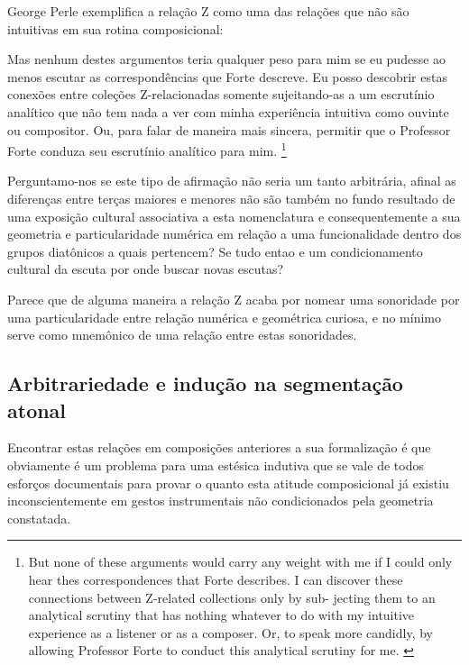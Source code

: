 \documentclass[
	12pt,				%
	openright,			%
	twoside,			%
	a4paper,			%
	english,			%
	french,				%
	spanish,			%
	brazil				%
	]{abntex2}
\begin{document}
George Perle exemplifica a relação Z como uma das relações que não são intuitivas em sua rotina composicional:





\begin{citacao}
Mas nenhum destes argumentos teria qualquer peso para mim se eu pudesse ao menos escutar as correspondências que Forte descreve. Eu posso descobrir estas conexões entre coleções Z-relacionadas somente sujeitando-as a um escrutínio analítico que não tem nada a ver com minha experiência intuitiva como ouvinte ou compositor. Ou, para falar de maneira mais sincera, permitir que o Professor Forte conduza seu escrutínio analítico para mim.
\cite[p.168]{perle1990pitch}\footnote{
But none of these arguments would carry any weight with me if
I could only hear thes correspondences that Forte describes. I can
discover these connections between Z-related collections only by sub-
jecting them to an analytical scrutiny that has nothing whatever to do
with my intuitive experience as a listener or as a composer. Or, to
speak more candidly, by allowing Professor Forte to conduct this
analytical scrutiny for me. 
\cite[p.168]{perle1990pitch}}
\end{citacao}

Perguntamo-nos se este tipo de afirmação não seria um tanto arbitrária, afinal as diferenças entre terças maiores e menores não são também no fundo resultado de uma exposição cultural associativa a esta nomenclatura e consequentemente a sua geometria e particularidade numérica em relação a uma funcionalidade dentro dos grupos diatônicos a quais pertencem? Se tudo entao e um condicionamento cultural da escuta por onde buscar novas escutas?

Parece que de alguma maneira a relação Z acaba por nomear uma sonoridade por uma particularidade entre relação numérica e geométrica curiosa, e no mínimo serve como mnemônico de uma relação entre estas sonoridades.

\subsection{Arbitrariedade e indução  na segmentação atonal}

Encontrar estas relações em composições anteriores a sua formalização é que obviamente é um problema para uma estésica indutiva\cite{nattiez2001tripartite} que se vale de todos esforços documentais para provar o quanto esta atitude composicional já existiu inconscientemente em gestos instrumentais não condicionados pela geometria constatada.
\end{document}
